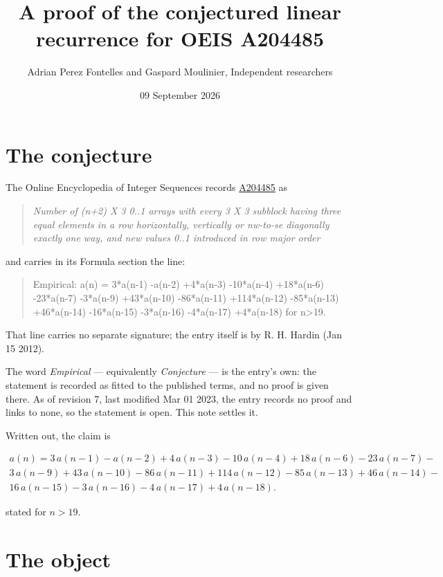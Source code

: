 \documentclass[11pt]{article}
\title{A proof of the conjectured linear recurrence for OEIS A204485}
\author{Adrian Perez Fontelles and Gaspard Moulinier, Independent researchers}
\date{09 September 2026}
\theoremstyle{definition}
\begin{document}
\maketitle
\section{The conjecture}

The Online Encyclopedia of Integer Sequences records \href{https://oeis.org/A204485}{A204485} as

\begin{quote}\itshape Number of (n+2) X 3 0..1 arrays with every 3 X 3 subblock having three equal elements in a row horizontally, vertically or nw-to-se diagonally exactly one way, and new values 0..1 introduced in row major order\end{quote}

and carries in its Formula section the line:

\begin{quote}\ttfamily Empirical: a(n) = 3*a(n-1) -a(n-2) +4*a(n-3) -10*a(n-4) +18*a(n-6) -23*a(n-7) -3*a(n-9) +43*a(n-10) -86*a(n-11) +114*a(n-12) -85*a(n-13) +46*a(n-14) -16*a(n-15) -3*a(n-16) -4*a(n-17) +4*a(n-18) for n>19.\end{quote}

That line carries no separate signature; the entry itself is by R. H. Hardin (Jan 15 2012).

The word {\itshape Empirical} --- equivalently {\itshape Conjecture} --- is the entry's own: the statement is recorded as fitted to the published terms, and no proof is given there. As of revision 7, last modified Mar 01 2023, the entry records no proof and links to none, so the statement is open. This note settles it.

Written out, the claim is

\begin{multline*} a(n) = 3\,a(n-1) - a(n-2) + 4\,a(n-3) - 10\,a(n-4) + 18\,a(n-6) - 23\,a(n-7) - \\ 3\,a(n-9) + 43\,a(n-10) - 86\,a(n-11) + 114\,a(n-12) - 85\,a(n-13) + 46\,a(n-14) - \\ 16\,a(n-15) - 3\,a(n-16) - 4\,a(n-17) + 4\,a(n-18). \end{multline*}

stated for $n > 19$.

\section{The object}
\end{document}
